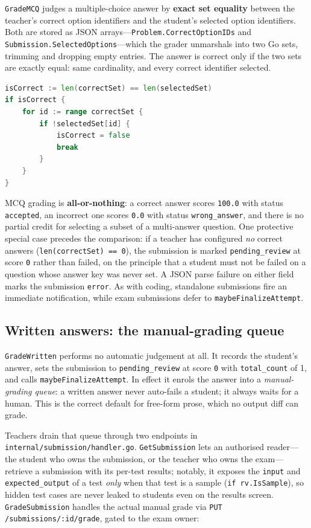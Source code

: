 \texttt{GradeMCQ} judges a multiple-choice answer by \textbf{exact set equality} between the
teacher's correct option identifiers and the student's selected option identifiers. Both are
stored as JSON arrays---\texttt{Problem.CorrectOptionIDs} and
\texttt{Submission.SelectedOptions}---which the grader unmarshals into two Go sets, trimming and
dropping empty entries. The answer is correct only if the two sets are exactly equal:
same cardinality, and every correct identifier selected.

\begin{lstlisting}[language=Go,caption={Set-equality decision in \texttt{GradeMCQ} (\texttt{grader.go}).},label={lst:mcq}]
isCorrect := len(correctSet) == len(selectedSet)
if isCorrect {
	for id := range correctSet {
		if !selectedSet[id] {
			isCorrect = false
			break
		}
	}
}
\end{lstlisting}

MCQ grading is \textbf{all-or-nothing}: a correct answer scores \texttt{100.0} with status
\texttt{accepted}, an incorrect one scores \texttt{0.0} with status \texttt{wrong\_answer}, and
there is no partial credit for selecting a subset of a multi-answer question. One protective
special case precedes the comparison: if a teacher has configured \emph{no} correct answers
(\texttt{len(correctSet) == 0}), the submission is marked \texttt{pending\_review} at score
\texttt{0} rather than failed, on the principle that a student must not be failed on a question
whose answer key was never set. A JSON parse failure on either field marks the submission
\texttt{error}. As with coding, standalone submissions fire an immediate notification, while
exam submissions defer to \texttt{maybeFinalizeAttempt}.

\subsection{Written answers: the manual-grading queue}\label{sec:grading-written}

\texttt{GradeWritten} performs no automatic judgement at all. It records the student's answer,
sets the submission to \texttt{pending\_review} at score \texttt{0} with \texttt{total\_count} of
1, and calls \texttt{maybeFinalizeAttempt}. In effect it enrols the answer into a
\emph{manual-grading queue}: a written answer never auto-fails a student; it always waits for a
human. This is the correct default for free-form prose, which no output diff can grade.

Teachers drain that queue through two endpoints in \texttt{internal/submission/handler.go}.
\texttt{GetSubmission} lets an authorised reader---the student who owns the submission, or the
teacher who owns the exam---retrieve a submission with its per-test results; notably, it exposes
the \texttt{input} and \texttt{expected\_output} of a test \emph{only} when that test is a
sample (\texttt{if rv.IsSample}), so hidden test cases are never leaked to students even on the
results screen. \texttt{GradeSubmission} handles the actual manual grade via
\texttt{PUT /submissions/:id/grade}, gated to the exam owner:

